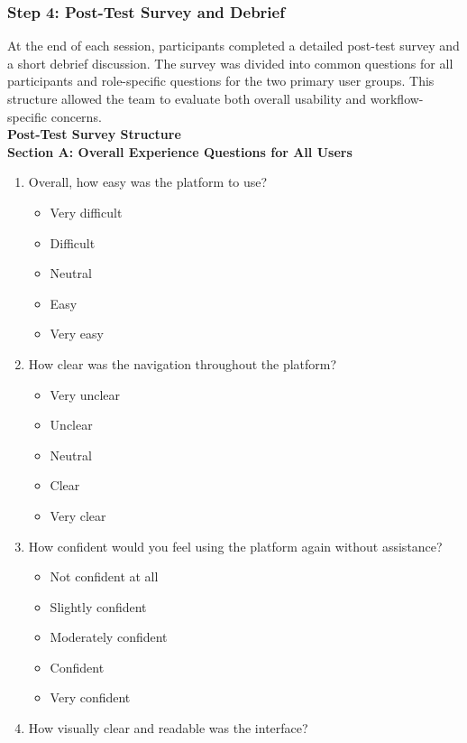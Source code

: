 \documentclass[12pt]{article}
\begin{document}
\subsubsection{Step 4: Post-Test Survey and Debrief}
At the end of each session, participants completed a detailed post-test survey and a short debrief discussion. The survey was divided into common questions for all participants and role-specific questions for the two primary user groups. This structure allowed the team to evaluate both overall usability and workflow-specific concerns.\\
\textbf{Post-Test Survey Structure}\\
\textbf{Section A: Overall Experience Questions for All Users}
\begin{enumerate}
    \item Overall, how easy was the platform to use?
    \begin{itemize}[label=$\circ$]
        \item Very difficult
        \item Difficult
        \item Neutral
        \item Easy
        \item Very easy
    \end{itemize}
    \item How clear was the navigation throughout the platform?
    \begin{itemize}[label=$\circ$]
        \item Very unclear
        \item Unclear
        \item Neutral
        \item Clear
        \item Very clear
    \end{itemize}
    \item How confident would you feel using the platform again without assistance?
    \begin{itemize}[label=$\circ$]
        \item Not confident at all
        \item Slightly confident
        \item Moderately confident
        \item Confident
        \item Very confident
    \end{itemize}
    \item How visually clear and readable was the interface?

\end{enumerate}
\end{document}
